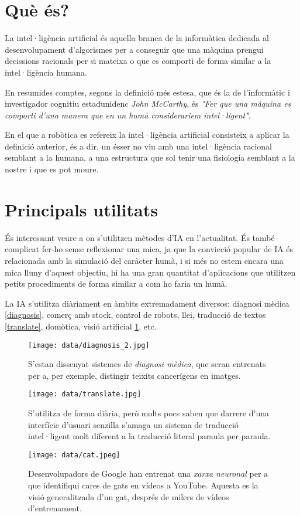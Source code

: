 \section{Què és?}

La intel·ligència artificial és aquella branca de la informàtica dedicada al
desenvolupament d'algorismes per a conseguir que una màquina prengui decissions
 racionals per si mateixa o que es comporti de forma similar a la intel·ligència humana.

En resumides comptes, segons la definició més estesa, que és la de l'informàtic i
investigador cognitiu estadunidenc \emph{John McCarthy}, és \emph{"Fer que una màquina
es comporti d'una manera que en un humà considerariem intel·ligent"}.

En el que a robòtica es refereix la intel·ligència artificial consisteix a aplicar la
definició anterior, és a dir, un ésser no viu amb una intel·ligència racional semblant
a la humana, a una estructura que sol tenir una fisiologia semblant a la nostre i que
es pot moure.
\cite{definiciondeia} \cite{wikiia} \cite{monoia}

\section{Principals utilitats}

És interessant veure a on s'utilitzen mètodes d'IA en l'actualitat. És també complicat fer-ho sense reflexionar una mica, ja que la convicció popular de IA és relacionada amb la simulació del caràcter humà, i si més no estem encara una mica lluny d'aquest objectiu, hi ha una gran quantitat d'aplicacions que utilitzen petits procediments de forma similar a com ho faria un humà.

La IA s'utilitza diàriament en àmbits extremadament diversos: diagnosi mèdica \ref{diagnosis}, comerç amb stock, control de robots, llei, traducció de textos \ref{translate}, domòtica, visió artificial \ref{cat}, etc.


\begin{figure}[ht!]
\centering
\texttt{[image: data/diagnosis\_2.jpg]}
\caption{S'estan dissenyat sistemes de \emph{diagnosi mèdica}, que seran entrenats per a, per exemple, distingir teixits cancerígens en imatges.}
\label{diagnosis}

\texttt{[image: data/translate.jpg]}
\caption{S'utilitza de forma diària, però molts pocs saben que darrere d'una interfície d'usuari senzilla s'amaga un sistema de traducció intel·ligent molt diferent a la traducció literal paraula per paraula.}
\label{translate}

\texttt{[image: data/cat.jpeg]}
\caption{Desenvolupadors de Google han entrenat una \emph{xarxa neuronal} per a que identifiqui cares de gats en vídeos a YouTube. Aquesta es la visió generalitzada d'un gat, després de milers de vídeos d'entrenament. \cite{googlecat}}
\label{cat}
\end{figure}